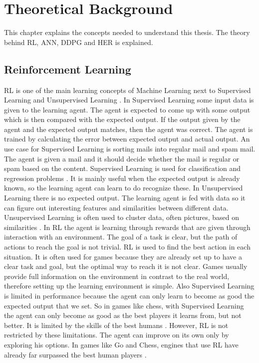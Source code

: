 \chapter{Theoretical Background}

This chapter explains the concepts needed to understand this thesis. The theory behind RL, ANN, DDPG and HER is explained.

\section{Reinforcement Learning}

RL is one of the main learning concepts of Machine Learning next to Supervised Learning and Unsupervised Learning \cite{machinelearning}.
\newline
In Supervised Learning some input data is given to the learning agent. The agent is expected to come up with some output which is then compared with the expected output. If the output given by the agent and the expected output matches, then the agent was correct. The agent is trained by calculating the error between expected output and actual output. An use case for Supervised Learning is sorting mails into regular mail and spam mail. The agent is given a mail and it should decide whether the mail is regular or spam based on the content. Supervised Learning is used for classification and regression problems \cite{machinelearning}. It is mainly useful when the expected output is already known, so the learning agent can learn to do recognize these. 
\newline
In Unsupervised Learning there is no expected output. The learning agent is fed with data so it can figure out interesting features and similarities between different data. Unsupervised Learning is often used to cluster data, often pictures, based on similarities \cite{machinelearning}.
\newline
In RL the agent is learning through rewards that are given through interaction with an environment. The goal of a task is clear, but the path of actions to reach the goal is not trivial. RL is used to find the best action in each situation. It is often used for games because they are already set up to have a clear task and goal, but the optimal way to reach it is not clear. Games usually provide full information on the environment in contrast to the real world, therefore setting up the learning environment is simple. Also Supervised Learning is limited in performance because the agent can only learn to become as good the expected output that we set. So in games like chess, with Supervised Learning the agent can only become as good as the best players it learns from, but not better. It is limited by the skills of the best humans \cite{nolimit}. However, RL is not restricted by these limitations. The agent can improve on its own only by exploring his options. In games like Go and Chess, engines that use RL have already far surpassed the best human players \cite{alphazero}. 

